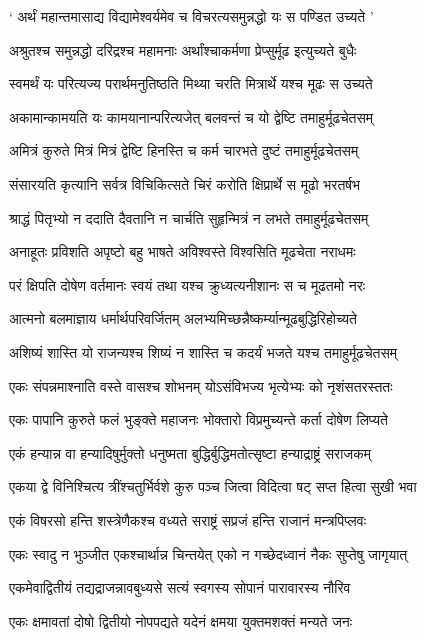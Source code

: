 \twolineshloka
{` अर्थं महान्तमासाद्य विद्यामेश्वर्यमेव च}
{विचरत्यसमुन्नद्धो यः स पण्डित उच्यते '}


\twolineshloka
{अश्रुतश्च समुन्नद्धो दरिद्रश्च महामनाः}
{अर्थांश्चाकर्मणा प्रेप्सुर्मूढ इत्युच्यते बुधैः}


\twolineshloka
{स्वमर्थं यः परित्यज्य परार्थमनुतिष्ठति}
{मिथ्या चरति मित्रार्थे यश्च मूढः स उच्यते}


\twolineshloka
{अकामान्कामयति यः कामयानान्परित्यजेत्}
{बलवन्तं च यो द्वेष्टि तमाहुर्मूढचेतसम्}


\twolineshloka
{अमित्रं कुरुते मित्रं मित्रं द्वेष्टि हिनस्ति च}
{कर्म चारभते दुष्टं तमाहुर्मूढचेतसम्}


\twolineshloka
{संसारयति कृत्यानि सर्वत्र विचिकित्सते}
{चिरं करोति क्षिप्रार्थे स मूढो भरतर्षभ}


\twolineshloka
{श्राद्धं पितृभ्यो न ददाति दैवतानि न चार्चति}
{सुहृन्मित्रं न लभते तमाहुर्मूढचेतसम्}


\twolineshloka
{अनाहूतः प्रविशति अपृष्टो बहु भाषते}
{अविश्वस्ते विश्वसिति मूढचेता नराधमः}


\twolineshloka
{परं क्षिपति दोषेण वर्तमानः स्वयं तथा}
{यश्च क्रुध्यत्यनीशानः स च मूढतमो नरः}


\twolineshloka
{आत्मनो बलमाज्ञाय धर्मार्थपरिवर्जितम्}
{अलभ्यमिच्छन्नैष्कर्म्यान्मूढबुद्धिरिहोच्यते}


\twolineshloka
{अशिष्यं शास्ति यो राजन्यश्च शिष्यं न शास्ति च}
{कदर्यं भजते यश्च तमाहुर्मूढचेतसम्}


\twolineshloka
{एकः संपन्नमाश्नाति वस्ते वासश्च शोभनम्}
{योऽसंविभज्य भृत्येभ्यः को नृशंसतरस्ततः}


\twolineshloka
{एकः पापानि कुरुते फलं भुङ्क्ते महाजनः}
{भोक्तारो विप्रमुच्यन्ते कर्ता दोषेण लिप्यते}


\twolineshloka
{एकं हन्यान्न वा हन्यादिषुर्मुक्तो धनुष्मता}
{बुद्धिर्बुद्धिमतोत्सृष्टा हन्याद्राष्ट्रं सराजकम्}


\twolineshloka
{एकया द्वे विनिश्चित्य त्रींश्चतुर्भिर्वशे कुरु}
{पञ्च जित्वा विदित्वा षट् सप्त हित्वा सुखी भवा}


\twolineshloka
{एकं विषरसो हन्ति शस्त्रेणैकश्च वध्यते}
{सराष्ट्रं सप्रजं हन्ति राजानं मन्त्रपिप्लवः}


\twolineshloka
{एकः स्वादु न भुञ्जीत एकश्चार्थान्न चिन्तयेत्}
{एको न गच्छेदध्वानं नैकः सुप्तेषु जागृयात्}


\twolineshloka
{एकमेवाद्वितीयं तद्यद्राजन्नावबुध्यसे}
{सत्यं स्वगस्य सोपानं पारावारस्य नौरिव}


\twolineshloka
{एकः क्षमावतां दोषो द्वितीयो नोपपद्यते}
{यदेनं क्षमया युक्तमशक्तं मन्यते जनः}


